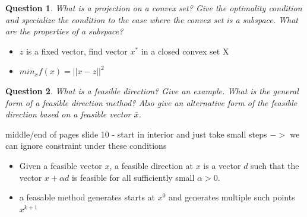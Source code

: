 \documentclass{article}
\newtheorem{question}{Question}
\begin{document}
\begin{question}
  What is a projection on a convex set? Give the optimality condition and specialize the condition
  to the case where the convex set is a subspace.  What are the properties of a subspace?
\end{question}
\begin{itemize}
\item $z$ is a fixed vector, find vector $x^*$ in a closed convex set X
\item $min_x f(x) = || x - z || ^2$
\end{itemize}

\begin{question}
  What is a feasible direction? Give an example. What is the general form of a feasible direction
  method? Also give an alternative form of the feasible direction based on a feasible vector
  \(\bar{x}\).
\end{question}
middle/end of pages slide 10 - start in interior and just take small steps $->$ we can ignore
constraint under these conditions
\begin{itemize}
\item Given a feasible vector $x$, a feasible
  direction at $x$ is a vector $d$ such that the
  vector $x + \alpha d$ is feasible for all sufficiently
  small $\alpha > 0$.
\item a feasable method generates starts at $x^0$ and generates multiple such points $x^{k+1}$
\end{itemize}
\end{document}
